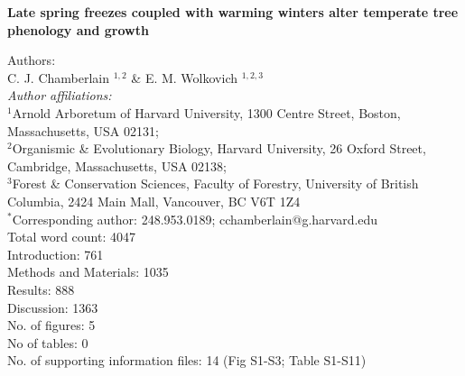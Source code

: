 \documentclass{article}
\begin{document}
\noindent \textbf{\Large{Late spring freezes coupled with warming winters alter temperate tree phenology and growth}}


\noindent Authors:\\
C. J. Chamberlain $^{1,2}$ \& E. M. Wolkovich $^{1,2,3}$
\vspace{2ex}\\
\emph{Author affiliations:}\\
$^{1}$Arnold Arboretum of Harvard University, 1300 Centre Street, Boston, Massachusetts, USA 02131; \\
$^{2}$Organismic \& Evolutionary Biology, Harvard University, 26 Oxford Street, Cambridge, Massachusetts, USA 02138; \\
$^{3}$Forest \& Conservation Sciences, Faculty of Forestry, University of British Columbia, 2424 Main Mall, Vancouver, BC V6T 1Z4\\
\vspace{2ex}
$^*$Corresponding author: 248.953.0189; cchamberlain@g.harvard.edu\\


Total word count: 4047 \\
Introduction: 761 \\
Methods and Materials: 1035\\
Results: 888\\
Discussion: 1363 \\

No. of figures: 5\\
No of tables: 0 \\
No. of supporting information files: 14 (Fig S1-S3; Table S1-S11)\\ 

\renewcommand{\thetable}{\arabic{table}}
\renewcommand{\thefigure}{\arabic{figure}}
\end{document}
